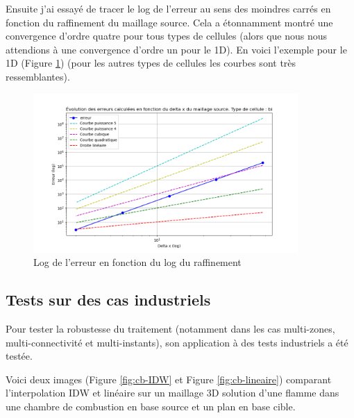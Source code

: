Ensuite j'ai essayé de tracer le log de l'erreur au sens des moindres carrés en fonction du raffinement du maillage source. Cela a étonnamment montré une convergence d'ordre quatre pour tous types de cellules (alors que nous nous attendions à une convergence d'ordre un pour le 1D). En voici l'exemple pour le 1D (Figure \ref{fig:bi}) (pour les autres types de cellules les courbes sont très ressemblantes).
\begin{figure}[H]
    \centering
    \includegraphics[width=0.90\textwidth]{images/err_puissance2_bi.png}
    \caption{Log de l'erreur en fonction du log du raffinement}
    \label{fig:bi}
\end{figure}


\subsection{Tests sur des cas industriels}

Pour tester la robustesse du traitement (notamment dans les cas multi-zones, multi-connectivité et multi-instants), son application à des tests industriels a été testée.

Voici deux images (Figure \ref{fig:cb-IDW} et Figure \ref{fig:cb-lineaire}) comparant l'interpolation IDW et linéaire sur un maillage 3D solution d'une flamme dans une chambre de combustion en base source et un plan en base cible.

